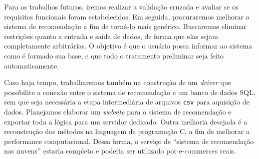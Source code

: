 Para os trabalhos futuros, iremos realizar a validação cruzada e avaliar se os requisitos funcionais foram estabelecidos. Em seguida, procuraremos melhorar o sistema de recomendação a fim de torná-lo mais genérico. Buscaremos eliminar restrições quanto a entrada e saída de dados, de forma que elas sejam completamente arbitrárias. O objetivo é que o usuário possa informar ao sistema como é formado sua base, e que todo o tratamento preliminar seja feito automaticamente. 

Caso haja tempo, trabalharemos também na construção de um \textit{driver} que possibilite a conexão entre o sistema de recomendação e um banco de dados SQL, sem que seja necessária a etapa intermediária de arquivos \texttt{csv} para aquisição de dados. Planejamos elaborar um \textit{website} para o sistema de recomendação e exportar toda a lógica para um servidor dedicado. Outra melhoria desejada é a reconstrução dos métodos na linguagem de programação C, a fim de melhorar a performance computacional. Dessa forma, o serviço de ``sistema de recomendação nas nuvens'' estaria completo e poderia ser utilizado por e-commerces reais.